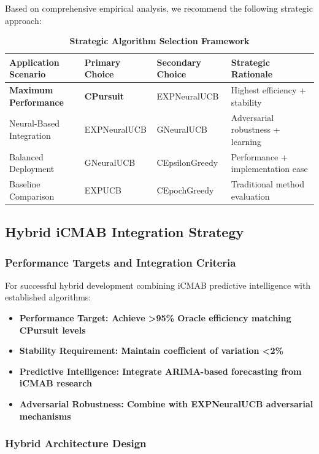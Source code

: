 \documentclass[12pt,a4paper]{article}
\newcommand{\hybrid}[1]{\textcolor{hybridcolor}{\textbf{#1}}}
\begin{document}
Based on comprehensive empirical analysis, we recommend the following strategic approach:

\begin{table}[H]
\centering
\caption{\hybrid{Strategic Algorithm Selection Framework}}
\begin{tabular}{|l|l|l|l|}
\hline
\textbf{Application Scenario} & \textbf{Primary Choice} & \textbf{Secondary Choice} & \textbf{Strategic Rationale} \\
\hline
\hline
\hybrid{Maximum Performance} & \hybrid{CPursuit} & EXPNeuralUCB & Highest efficiency + stability \\
Neural-Based Integration & EXPNeuralUCB & GNeuralUCB & Adversarial robustness + learning \\
Balanced Deployment & GNeuralUCB & CEpsilonGreedy & Performance + implementation ease \\
Baseline Comparison & EXPUCB & CEpochGreedy & Traditional method evaluation \\
\hline
\end{tabular}
\end{table}

\subsection{Hybrid iCMAB Integration Strategy}

\subsubsection{Performance Targets and Integration Criteria}

For successful hybrid development combining iCMAB predictive intelligence with established algorithms:

\begin{itemize}
\item \hybrid{\textbf{Performance Target}: Achieve >95\% Oracle efficiency matching CPursuit levels}
\item \hybrid{\textbf{Stability Requirement}: Maintain coefficient of variation <2\%}
\item \hybrid{\textbf{Predictive Intelligence}: Integrate ARIMA-based forecasting from iCMAB research}
\item \hybrid{\textbf{Adversarial Robustness}: Combine with EXPNeuralUCB adversarial mechanisms}
\end{itemize}

\subsubsection{Hybrid Architecture Design}
\end{document}
